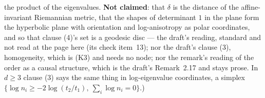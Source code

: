 \begin{lemma}
{the product of the eigenvalues. \textbf{Not claimed}: that $\delta$ is the distance of the
affine-invariant Riemannian metric, that the shapes of determinant $1$ in the plane form the
hyperbolic plane with orientation and log-anisotropy as polar coordinates, and so that clause (4)'s
set is a geodesic disc --- the draft's reading, standard and not read at the page here (its check
item~13); nor the draft's clause (3), homogeneity, which is (K3) and needs no node; nor the
remark's reading of the order as a causal structure, which is the draft's Remark~2.17 and stays
prose. In $d \ge 3$ clause (3) says the same thing in log-eigenvalue coordinates, a simplex
$\{\log n_i \ge -2\log(t_2/t_1),\ \sum_i\log n_i = 0\}$.)}
\end{lemma}

